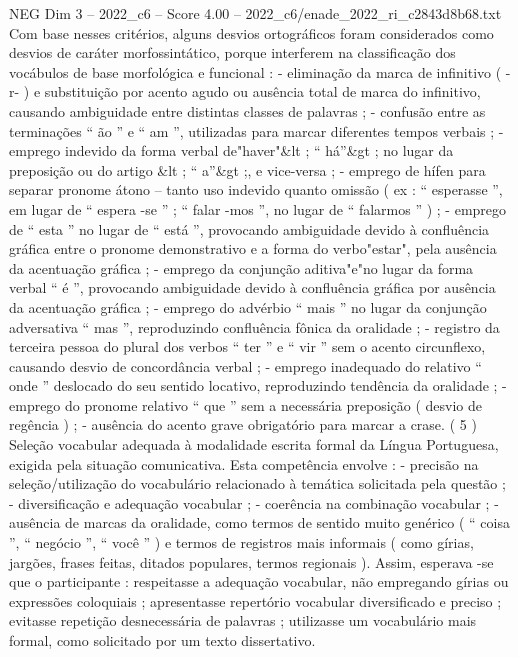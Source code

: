 \begin{textsample}{NEG Dim 3 – 2022\_c6 – Score 4.00 – 2022\_c6/enade\_2022\_ri\_c2843d8b68.txt}
Com base nesses critérios, alguns desvios ortográficos foram considerados como desvios de caráter morfossintático, porque interferem na classificação dos vocábulos de base morfológica e funcional : - eliminação da marca de infinitivo ( -r- ) e substituição por acento agudo ou ausência total de marca do infinitivo, causando ambiguidade entre distintas classes de palavras ; - confusão entre as terminações “ ão ” e “ am ”, utilizadas para marcar diferentes tempos verbais ; - emprego indevido da forma verbal de"haver"\&lt ; “ há”\&gt ; no lugar da preposição ou do artigo \&lt ; “ a”\&gt ;, e vice-versa ; - emprego de hífen para separar pronome átono – tanto uso indevido quanto omissão ( ex : “ esperasse ”, em lugar de “ espera -se ” ; “ falar -mos ”, no lugar de “ falarmos ” ) ; - emprego de “ esta ” no lugar de “ está ”, provocando ambiguidade devido à confluência gráfica entre o pronome demonstrativo e a forma do verbo"estar", pela ausência da acentuação gráfica ; - emprego da conjunção aditiva"e"no lugar da forma verbal “ é ”, provocando ambiguidade devido à confluência gráfica por ausência da acentuação gráfica ; - emprego do advérbio “ mais ” no lugar da conjunção adversativa “ mas ”, reproduzindo confluência fônica da oralidade ; - registro da terceira pessoa do plural dos verbos “ ter ” e “ vir ” sem o acento circunflexo, causando desvio de concordância verbal ; - emprego inadequado do relativo “ onde ” deslocado do seu sentido locativo, reproduzindo tendência da oralidade ; - emprego do pronome relativo “ que ” sem a necessária preposição ( desvio de regência ) ; - ausência do acento grave obrigatório para marcar a crase. ( 5 ) Seleção vocabular adequada à modalidade escrita formal da Língua Portuguesa, exigida pela situação comunicativa.
Esta competência envolve : - precisão na seleção/utilização do vocabulário relacionado à temática solicitada pela questão ; - diversificação e adequação vocabular ; - coerência na combinação vocabular ; - ausência de marcas da oralidade, como termos de sentido muito genérico ( “ coisa ”, “ negócio ”, “ você ” ) e termos de registros mais informais ( como gírias, jargões, frases feitas, ditados populares, termos regionais ).
Assim, esperava -se que o participante : respeitasse a adequação vocabular, não empregando gírias ou expressões coloquiais ; apresentasse repertório vocabular diversificado e preciso ; evitasse repetição desnecessária de palavras ; utilizasse um vocabulário mais formal, como solicitado por um texto dissertativo.

\end{textsample}
